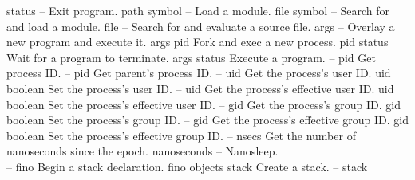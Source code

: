\begin{longtable}{}
\hline
\optableent
	{status}
	{{\bf {}}}
	{--}
	{Exit program.}
\hline
\optableent
	{path symbol}
	{{\bf {}}}
	{--}
	{Load a module.}
\hline
\optableent
	{file symbol}
	{{\bf {}}}
	{--}
	{Search for and load a module.}
\hline
\optableent
	{file}
	{{\bf {}}}
	{--}
	{Search for and evaluate a source file.}
\hline
\optableent
	{args}
	{{\bf {}}}
	{--}
	{Overlay a new program and execute it.}
\hline
\optableent
	{args}
	{{\bf {}}}
	{pid}
	{Fork and exec a new process.}
\hline
\optableent
	{pid}
	{{\bf {}}}
	{status}
	{Wait for a program to terminate.}
\hline
\optableent
	{args}
	{{\bf {}}}
	{status}
	{Execute a program.}
\hline
\optableent
	{--}
	{{\bf {}}}
	{pid}
	{Get process ID.}
\hline
\optableent
	{--}
	{{\bf {}}}
	{pid}
	{Get parent's process ID.}
\hline
\optableent
	{--}
	{{\bf {}}}
	{uid}
	{Get the process's user ID.}
\hline
\optableent
	{uid}
	{{\bf {}}}
	{boolean}
	{Set the process's user ID.}
\hline
\optableent
	{--}
	{{\bf {}}}
	{uid}
	{Get the process's effective user ID.}
\hline
\optableent
	{uid}
	{{\bf {}}}
	{boolean}
	{Set the process's effective user ID.}
\hline
\optableent
	{--}
	{{\bf {}}}
	{gid}
	{Get the process's group ID.}
\hline
\optableent
	{gid}
	{{\bf {}}}
	{boolean}
	{Set the process's group ID.}
\hline
\optableent
	{--}
	{{\bf {}}}
	{gid}
	{Get the process's effective group ID.}
\hline
\optableent
	{gid}
	{{\bf {}}}
	{boolean}
	{Set the process's effective group ID.}
\hline
\optableent
	{--}
	{{\bf {}}}
	{nsecs}
	{Get the number of nanoseconds since the epoch.}
\hline
\optableent
	{nanoseconds}
	{{\bf {}}}
	{--}
	{Nanosleep.}
\hline \hline
{} \\
\hline \hline
\optableent
	{--}
	{{\bf {}}}
	{fino}
	{Begin a stack declaration.}
\hline
\optableent
	{fino objects}
	{{\bf {}}}
	{stack}
	{Create a stack.}
\hline
\optableent
	{--}
	{{\bf {}}}
	{stack}

\end{longtable}
